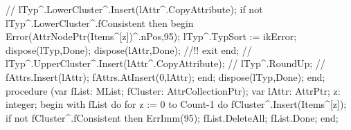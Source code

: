          //  lTyp^.LowerCluster^.Insert(lAttr^.CopyAttribute);
         if not lTyp^.LowerCluster^.fConsistent then
         begin
            Error(AttrNodePtr(Items^[z])^.nPos,95);
            lTyp^.TypSort := ikError;
            dispose(lTyp,Done);
            dispose(lAttr,Done); //!!
            exit
         end;
         //  lTyp^.UpperCluster^.Insert(lAttr^.CopyAttribute);
         //  lTyp^.RoundUp;
         //  fAttrs.Insert(lAttr);
         fAttrs.AtInsert(0,lAttr);
      end;
   dispose(lTyp,Done);
end;
\eatline
{}\nwendcode{}\nwdocspar
\nwenddocs{}\endmoddef\nwstartdeflinemarkup{}\nwenddeflinemarkup
procedure (var fList: MList; fCluster: AttrCollectionPtr);
var
   lAttr: AttrPtr;
   z: integer;
begin
   with fList do
      for z := 0 to Count-1 do
         fCluster^.Insert(Items^[z]);
   if not fCluster^.fConsistent then ErrImm(95);
   fList.DeleteAll;
   fList.Done;
end;
\eatline
{}\nwendcode{}\nwdocspar
\nwenddocs{}\endmoddef\nwstartdeflinemarkup{}\nwenddeflinemarkup
